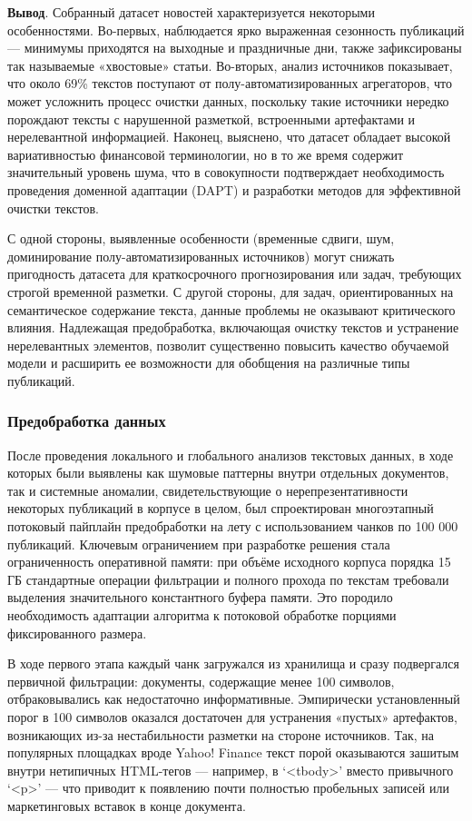 \textbf{Вывод}. Собранный датасет новостей характеризуется некоторыми особенностями. Во-первых, наблюдается ярко выраженная сезонность
публикаций --- минимумы приходятся на выходные и праздничные дни, также зафиксированы так называемые «хвостовые» статьи. Во-вторых,
анализ источников показывает, что около 69\% текстов поступают от полу-автоматизированных агрегаторов, что может усложнить процесс очистки
данных, поскольку такие источники нередко порождают тексты с нарушенной разметкой, встроенными артефактами и нерелевантной информацией.
Наконец, выяснено, что датасет обладает высокой вариативностью финансовой терминологии, но в то же время содержит значительный уровень шума,
что в совокупности подтверждает необходимость проведения доменной адаптации (DAPT) и разработки методов для эффективной очистки текстов.

С одной стороны, выявленные особенности (временные сдвиги, шум, доминирование полу-автоматизированных источников) могут
снижать пригодность датасета для краткосрочного прогнозирования или задач, требующих строгой временной разметки. С другой
стороны, для задач, ориентированных на семантическое содержание текста, данные проблемы не оказывают критического влияния.
Надлежащая предобработка, включающая очистку текстов и устранение нерелевантных элементов, позволит существенно повысить качество
обучаемой модели и расширить ее возможности для обобщения на различные типы публикаций.

\subsubsection{Предобработка данных}
\label{sec:data_prep}
После проведения локального и глобального анализов текстовых данных, в ходе которых были выявлены как шумовые
паттерны внутри отдельных документов, так и системные аномалии, свидетельствующие о нерепрезентативности некоторых
публикаций в корпусе в целом, был спроектирован многоэтапный потоковый пайплайн предобработки на лету с использованием
чанков по 100 000 публикаций. Ключевым ограничением при разработке решения стала ограниченность оперативной памяти: при
объёме исходного корпуса порядка 15 ГБ стандартные операции фильтрации и полного прохода по текстам требовали выделения
значительного константного буфера памяти. Это породило необходимость адаптации алгоритма к потоковой обработке порциями
фиксированного размера.

В ходе первого этапа каждый чанк загружался из хранилища и сразу подвергался первичной фильтрации: документы,
содержащие менее 100 символов, отбраковывались как недостаточно информативные. Эмпирически установленный порог
в 100 символов оказался достаточен для устранения «пустых» артефактов, возникающих из-за нестабильности разметки
на стороне источников. Так, на популярных площадках вроде Yahoo! Finance текст порой оказываются зашитым внутри
нетипичных HTML-тегов — например, в ‘<tbody>’ вместо привычного ‘<p>’ — что приводит к появлению почти полностью
пробельных записей или маркетинговых вставок в конце документа.

